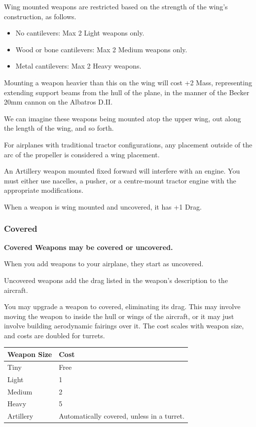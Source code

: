 \documentclass{article}
\begin{document}
Wing mounted weapons are restricted based on the strength of the wing's
construction, as follows.

\begin{itemize}
    \item          No cantilevers: Max 2 Light weapons only.
    \item          Wood or bone cantilevers: Max 2 Medium weapons only.
    \item          Metal cantilevers: Max 2 Heavy weapons.
\end{itemize}

Mounting a weapon heavier than this on the wing will cost +2 Mass,
representing extending support beams from the hull of the plane, in the
manner of the Becker 20mm cannon on the Albatros D.II.

We can imagine these weapons being mounted atop the upper wing, out
along the length of the wing, and so forth.

For airplanes with traditional tractor configurations, any placement
outside of the arc of the propeller is considered a wing placement.

An Artillery weapon mounted fixed forward will interfere with an engine.
You must either use nacelles, a pusher, or a centre-mount tractor engine
with the appropriate modifications.

When a weapon is wing mounted and uncovered, it has +1 Drag.

\subsubsection{Covered}
\label{_Covered}

\textbf{Covered Weapons may be covered or uncovered.}

When you add weapons to your airplane, they start as uncovered.

Uncovered weapons add the drag listed in the weapon's description to the
aircraft.

You may upgrade a weapon to covered, eliminating its drag. This may
involve moving the weapon to inside the hull or wings of the aircraft,
or it may just involve building aerodynamic fairings over it. The cost
scales with weapon size, and costs are doubled for turrets.

\begin{tabular}{|l|l|}
    \hline
    Weapon Size & Cost                                       \\\hline
    Tiny        & Free                                       \\\hline
    Light       & 1                                          \\\hline
    Medium      & 2                                          \\\hline
    Heavy       & 5                                          \\\hline
    Artillery   & Automatically covered, unless in a turret. \\\hline
\end{tabular}
\end{document}
